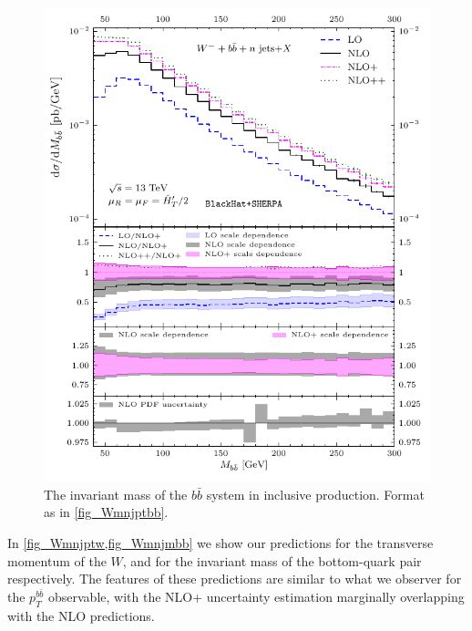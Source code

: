 \begin{figure}[ht]
  \centering
  \includegraphics[clip,scale=1]{plots/excl_mbb_v4}
  \caption{The invariant mass of the $b\bar b$ system in inclusive \Wbbm{} production. Format as in \cref{fig_Wmnjptbb}.}
  \label{fig_Wmnjmbb}
\end{figure}

In \cref{fig_Wmnjptw,fig_Wmnjmbb} we show
our predictions for the transverse momentum of the $W$, and
for the invariant mass of the bottom-quark pair respectively.
The features of these predictions are similar to what we observer for
the $p_T^{b\bar{b}}$ observable, with the NLO+ uncertainty estimation marginally
overlapping with the NLO predictions.

